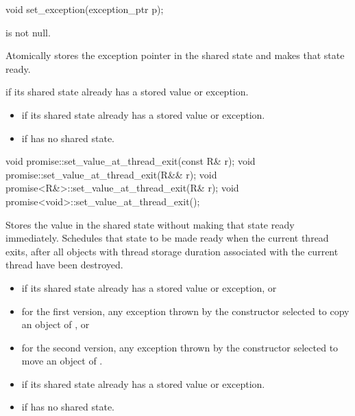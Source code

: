 %
\begin{itemdecl}
void set_exception(exception_ptr p);
\end{itemdecl}

\begin{itemdescr}
\pnum
\expects
{} is not null.

\pnum
\effects
Atomically stores the exception pointer  in the shared state
and makes that state ready.

\pnum
\throws
{} if its shared state
already has a stored value or exception.

\pnum
\errors

\begin{itemize}
\item {} if its shared state
already has a stored value or exception.
\item {} if  has no shared state.
\end{itemize}
\end{itemdescr}

%
\begin{itemdecl}
void promise::set_value_at_thread_exit(const R& r);
void promise::set_value_at_thread_exit(R&& r);
void promise<R&>::set_value_at_thread_exit(R& r);
void promise<void>::set_value_at_thread_exit();
\end{itemdecl}

\begin{itemdescr}
\pnum
\effects
Stores the value  in the shared state without making that
state ready immediately. Schedules that state to be made ready when the current
thread exits, after all objects with thread storage duration associated with the
current thread have been destroyed.

\pnum
\throws
\begin{itemize}
\item {} if its shared state
already has a stored value or exception, or
\item for the first version, any exception thrown by the constructor selected to copy an object of , or
\item for the second version, any exception thrown by the constructor selected to move an object of .
\end{itemize}

\pnum
\errors
\begin{itemize}
\item {} if its shared state
already has a stored value or exception.
\item {} if  has no shared state.
\end{itemize}
\end{itemdescr}

